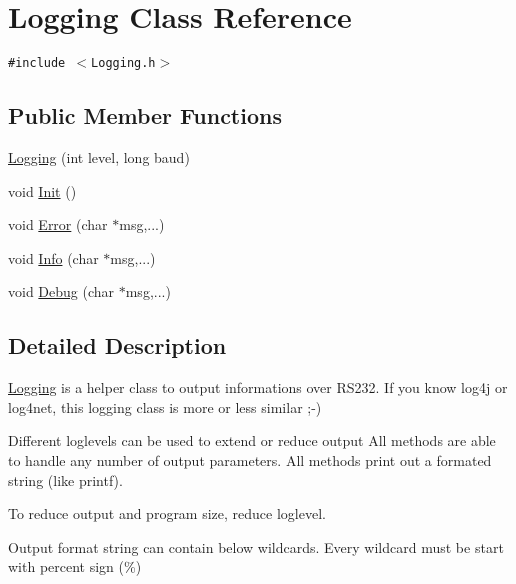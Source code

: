 \hypertarget{class_logging}{
\section{Logging Class Reference}
\label{class_logging}
}
{\tt \#include $<$Logging.h$>$}

\subsection*{Public Member Functions}
\begin{CompactItemize}
\item 
\hyperlink{class_logging_411afcd8ebb0a1b4eb30f3dd8f09c8b5}{Logging} (int level, long baud)
\item 
void \hyperlink{class_logging_1abc9accbd1b01422eb65126f778aa24}{Init} ()
\item 
void \hyperlink{class_logging_1cf44ab531c72761fba811882336a2ad}{Error} (char $\ast$msg,...)
\item 
void \hyperlink{class_logging_8a99e1a55e2b24d864d89e9aa86b2f2e}{Info} (char $\ast$msg,...)
\item 
void \hyperlink{class_logging_e0fcd9e5350d7b9158c8ae9289fef193}{Debug} (char $\ast$msg,...)
\end{CompactItemize}


\subsection{Detailed Description}
\hyperlink{class_logging}{Logging} is a helper class to output informations over RS232. If you know log4j or log4net, this logging class is more or less similar ;-) \par
 Different loglevels can be used to extend or reduce output All methods are able to handle any number of output parameters. All methods print out a formated string (like printf).\par
 To reduce output and program size, reduce loglevel. \par
 Output format string can contain below wildcards. Every wildcard must be start with percent sign (\%)

